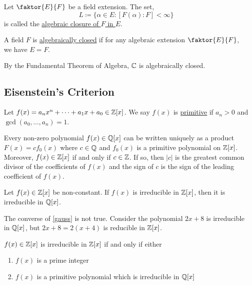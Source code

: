 \documentclass[11pt]{article}
\newcommand{\quotient}[2]{\faktor{#1}{#2}}
\begin{document}
\begin{definition}
Let $\quotient{E}{F}$ be a field extension. The set,
\begin{equation*}
L \coloneqq \{\alpha \in E: [F(\alpha) : F] < \infty\}
\end{equation*}
is called the \underline{algebraic closure of $F$ in $E$}.
\end{definition}
\begin{definition}
A field $F$ is \underline{algebraically closed} if for any algebraic extension
$\quotient{E}{F}$, we have $E = F$.
\end{definition}
\begin{example}
By the Fundamental Theorem of Algebra, $\mathbb{C}$ is algebraically closed.
\end{example}

\subsection{Eisenstein's Criterion}
\begin{definition}
Let $f(x) = a_nx^n + \dots + a_1x + a_0 \in \mathbb{Z}[x]$. We say $f(x)$ is
\underline{primitive} if $a_n > 0$ and $\gcd(a_0, \dots, a_n) = 1$. 
\end{definition}
\begin{lemma}
Every non-zero polynomial $f(x) \in \mathbb{Q}[x]$ can be written uniquely as a product
$F(x) = cf_0(x)$ where $c \in \mathbb{Q}$ and $f_0(x)$ is a primitive polynomial on
$\mathbb{Z}[x]$. Moreover, $f(x) \in \mathbb{Z}[x]$ if and only if $c \in \mathbb{Z}$. If so, then
$|c|$ is the greatest common divisor of the coefficients of $f(x)$ and the sign
of $c$ is the sign of the leading coefficient of $f(x)$.
\end{lemma}
\begin{theorem} \label{gauss}
Let $f(x) \in \mathbb{Z}[x]$ be non-constant. If $f(x)$ is irreducible in $\mathbb{Z}[x]$, then
it is irreducible in $\mathbb{Q}[x]$. 
\end{theorem}
\begin{example}
The converse of \cref{gauss} is not true. Consider the polynomial $2x + 8$ is
irreducible in $\mathbb{Q}[x]$, but $2x+8 = 2(x+4)$ is reducible in $\mathbb{Z}[x]$.
\end{example}
\begin{remark}
$f(x) \in \mathbb{Z}[x]$  is irreducible in $\mathbb{Z}[x]$ if and only if either
\begin{enumerate}
\item $f(x)$ is a prime integer
\item $f(x)$ is a primitive polynomial which is irreducible in $\mathbb{Q}[x]$
\end{enumerate}
\end{remark}
\end{document}

